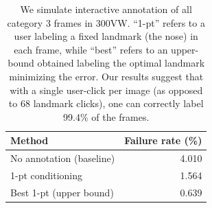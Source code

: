 \documentclass[letterpaper]{article} %
\newcommand{\eg}{\textit{e.g.}}
\begin{document}
\begin{table}[t]
\centering
\begin{tabular}{l||r}
\hline
Method &
Failure rate (\%) \\
\hline
No annotation (baseline)
& 4.010 \\ \hline
1-pt conditioning
& 1.564 \\ \hline
Best 1-pt (upper bound)
& 0.639 \\ \hline
\end{tabular}
\caption{We simulate interactive annotation of all category 3 frames in 300VW. ``1-pt'' refers to a user labeling a fixed landmark (the nose) in each frame, while ``best'' refers to an upper-bound obtained labeling the optimal landmark minimizing the error. Our results suggest that with a single user-click per image (as opposed to 68 landmark clicks), one can correctly label 99.4\% of the frames.}
\label{tab:condpred}
\end{table}
\end{document}
